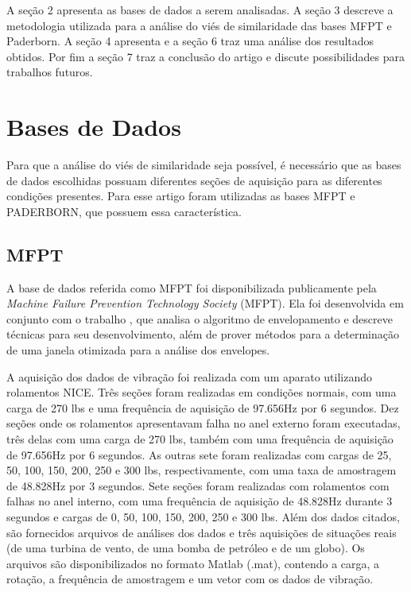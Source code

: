 \documentclass[letterpaper]{article}
\begin{document}
A seção 2 apresenta as bases de dados a serem analisadas. A seção 3 descreve a metodologia utilizada para a análise do viés de similaridade das bases MFPT e Paderborn. A seção 4 apresenta e a seção 6 traz uma análise dos resultados obtidos. Por fim a seção 7 traz a conclusão do artigo e discute possibilidades para trabalhos futuros.

\section{Bases de Dados}

Para que a análise do viés de similaridade seja possível, é necessário que as bases de dados escolhidas possuam diferentes seções de aquisição para as diferentes condições presentes. Para esse artigo foram utilizadas as bases MFPT e PADERBORN, que possuem essa característica.

\subsection{MFPT}

A base de dados referida como MFPT foi disponibilizada publicamente pela \textit{Machine Failure Prevention Technology Society} (MFPT). Ela foi desenvolvida em conjunto com o trabalho \cite{bechhoefer2016quick}, que analisa o algoritmo de envelopamento e descreve técnicas para seu desenvolvimento, além de prover métodos para a determinação de uma janela otimizada para a análise dos envelopes.

A aquisição dos dados de vibração foi realizada com um aparato utilizando rolamentos NICE. Três seções foram realizadas em condições normais, com uma carga de 270 lbs e uma frequência de aquisição de 97.656Hz por 6 segundos. Dez seções onde os rolamentos apresentavam falha no anel externo foram executadas, três delas com uma carga de 270 lbs, também com uma frequência de aquisição de 97.656Hz por 6 segundos. As outras sete foram realizadas com cargas de 25, 50, 100, 150, 200, 250 e 300 lbs, respectivamente, com uma taxa de amostragem de 48.828Hz por 3 segundos. Sete seções foram realizadas com rolamentos com falhas no anel interno, com uma frequência de aquisição de 48.828Hz durante 3 segundos e cargas de 0, 50, 100, 150, 200, 250 e 300 lbs. Além dos dados citados, são fornecidos arquivos de análises dos dados e três aquisições de situações reais (de uma turbina de vento, de uma bomba de petróleo e de um globo). Os arquivos são disponibilizados no formato Matlab (.mat), contendo a carga, a rotação, a frequência de amostragem e um vetor com os dados de vibração.
\end{document}
